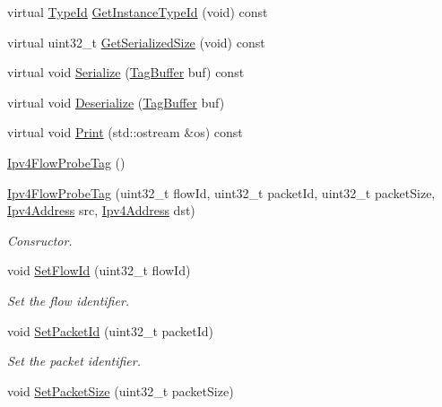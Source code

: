 \begin{DoxyCompactItemize}
\item 
virtual \hyperlink{classns3_1_1TypeId}{Type\+Id} \hyperlink{classns3_1_1Ipv4FlowProbeTag_a39204433736611241cfbd02152d17cb6}{Get\+Instance\+Type\+Id} (void) const 
\item 
virtual uint32\+\_\+t \hyperlink{classns3_1_1Ipv4FlowProbeTag_a72b26d26b49f361012202ba7de1dbaf1}{Get\+Serialized\+Size} (void) const 
\item 
virtual void \hyperlink{classns3_1_1Ipv4FlowProbeTag_a55fe37a15bf0074aa8ef331105302ac7}{Serialize} (\hyperlink{classns3_1_1TagBuffer}{Tag\+Buffer} buf) const 
\item 
virtual void \hyperlink{classns3_1_1Ipv4FlowProbeTag_a5deec6432e6924e3d57587a70426578f}{Deserialize} (\hyperlink{classns3_1_1TagBuffer}{Tag\+Buffer} buf)
\item 
virtual void \hyperlink{classns3_1_1Ipv4FlowProbeTag_a2c04243e65de62efcc8ae10773083391}{Print} (std\+::ostream \&os) const 
\item 
\hyperlink{classns3_1_1Ipv4FlowProbeTag_a45ae5fc04e38758906addd775098fc1b}{Ipv4\+Flow\+Probe\+Tag} ()
\item 
\hyperlink{classns3_1_1Ipv4FlowProbeTag_ae1908477a4f042d9e37afbecf319326f}{Ipv4\+Flow\+Probe\+Tag} (uint32\+\_\+t flow\+Id, uint32\+\_\+t packet\+Id, uint32\+\_\+t packet\+Size, \hyperlink{classns3_1_1Ipv4Address}{Ipv4\+Address} src, \hyperlink{classns3_1_1Ipv4Address}{Ipv4\+Address} dst)
\begin{DoxyCompactList}\small\item\em Consructor. \end{DoxyCompactList}\item 
void \hyperlink{classns3_1_1Ipv4FlowProbeTag_ad28df6f23431bbc244cb31d8f6b839d7}{Set\+Flow\+Id} (uint32\+\_\+t flow\+Id)
\begin{DoxyCompactList}\small\item\em Set the flow identifier. \end{DoxyCompactList}\item 
void \hyperlink{classns3_1_1Ipv4FlowProbeTag_aed73e5f4c7b00087563c44f7c2a91e0b}{Set\+Packet\+Id} (uint32\+\_\+t packet\+Id)
\begin{DoxyCompactList}\small\item\em Set the packet identifier. \end{DoxyCompactList}\item 
void \hyperlink{classns3_1_1Ipv4FlowProbeTag_aaf123d53af26a1d7e9f7ab264fbe76e3}{Set\+Packet\+Size} (uint32\+\_\+t packet\+Size)

\end{DoxyCompactItemize}
